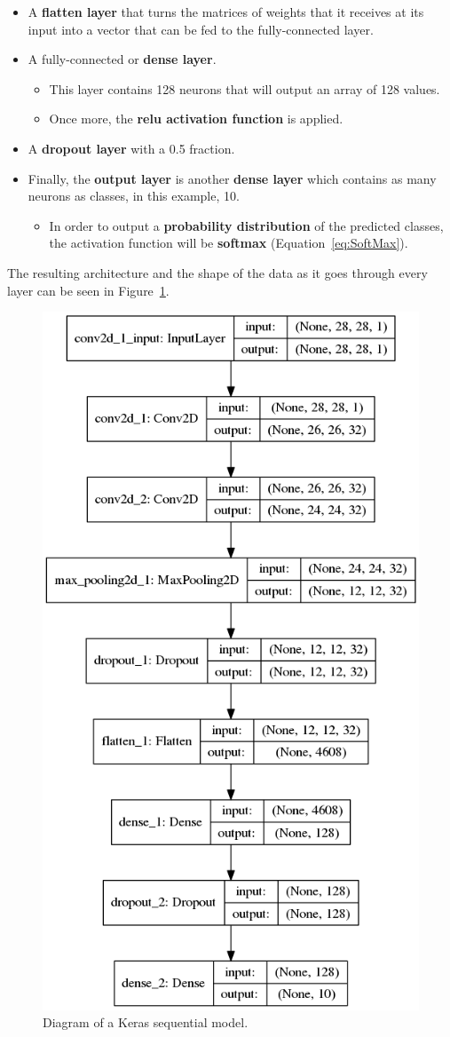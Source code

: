 \begin{itemize}
	\item A \textbf{flatten layer} that turns the matrices of weights that it receives at its input into a vector that can be fed to the fully-connected layer.
	\item A fully-connected or \textbf{dense layer}.
	\begin{itemize}
		\item This layer contains 128 neurons that will output an array of 128 values.
		\item Once more, the \textbf{\gls{relu} activation function} is applied.
	\end{itemize} 
	
	\item A \textbf{dropout layer} with a 0.5 fraction.
	
	\item Finally, the \textbf{output layer} is another \textbf{dense layer} which contains as many neurons as classes, in this example, 10. 
	\begin{itemize}
		\item In order to output a \textbf{probability distribution} of the predicted classes, the activation function will be \textbf{softmax} (Equation~\ref{eq:SoftMax}).
	\end{itemize}
\end{itemize}

The resulting architecture and the shape of the data as it goes through every layer can be seen in Figure~\ref{fig:model}.

\begin{figure}
	\centering
	\includegraphics[width=0.6\linewidth, keepaspectratio]{figures/model.png}
	\caption{Diagram of a Keras sequential model.}
	\label{fig:model}
\end{figure}

